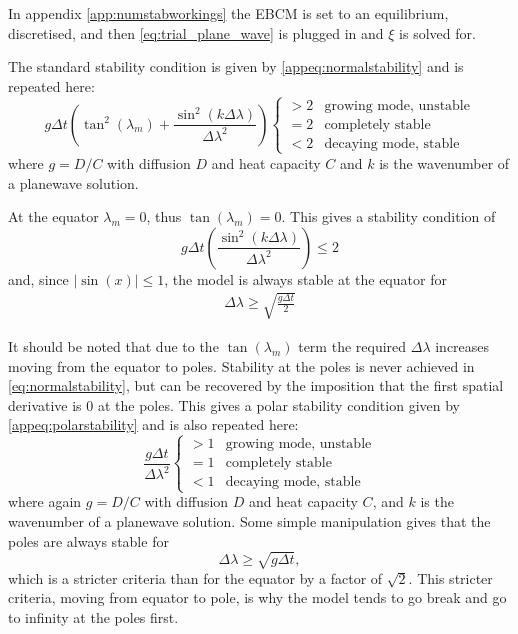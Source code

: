 \documentclass[12pt, onecolumn]{revtex4-2}    %
\begin{document}
In appendix \ref{app:numstabworkings} the EBCM is set to an equilibrium, discretised, and then \eqref{eq:trial_plane_wave} is plugged in and $\xi$ is solved for.

The standard stability condition is given by \eqref{appeq:normalstability} and is repeated here:
\begin{equation}\label{eq:normalstability}
    g\Delta t\left(\tan^2(\lambda_m) + \frac{\sin^2(k\Delta\lambda)}{\Delta\lambda^2}\right)
    \begin{cases}
        > 2 & \text{growing mode, unstable} \\
        = 2 & \text{completely stable}      \\
        < 2 & \text{decaying mode, stable}
    \end{cases}
\end{equation}
where $g = D / C$ with diffusion $D$ and heat capacity $C$ and $k$ is the wavenumber of a planewave solution.

At the equator $\lambda_m = 0$, thus $\tan(\lambda_m) = 0$. This gives a stability condition of
\begin{equation}
    g\Delta t\left(\frac{\sin^2(k\Delta\lambda)}{\Delta\lambda^2}\right) \le 2
\end{equation}
and, since $|\sin(x)| \le 1$, the model is always stable at the equator for
\begin{align*}
    \Delta\lambda \ge \sqrt{\frac{g\Delta t}{2}}
\end{align*}


It should be noted that due to the $\tan(\lambda_m)$ term the required $\Delta\lambda$ increases moving from the equator to poles.
Stability at the poles is never achieved in \eqref{eq:normalstability}, but can be recovered by the imposition that the first spatial derivative is $0$ at the poles.
This gives a polar stability condition given by \eqref{appeq:polarstability} and is also repeated here:
\begin{equation} \label{eq:polarstability}
    \frac{g\Delta t}{\Delta \lambda ^2}
    \begin{cases}
        > 1 & \text{growing mode, unstable} \\
        = 1 & \text{completely stable}      \\
        < 1 & \text{decaying mode, stable}
    \end{cases}
\end{equation}
where again $g = D / C$ with diffusion $D$ and heat capacity $C$, and $k$ is the wavenumber of a planewave solution.
Some simple manipulation gives that the poles are always stable for
\begin{equation}
    \Delta\lambda \ge \sqrt{g\Delta t},
\end{equation}
which is a stricter criteria than for the equator by a factor of $\sqrt{2}$.
This stricter criteria, moving from equator to pole, is why the model tends to go break and go to infinity at the poles first.
\end{document}
